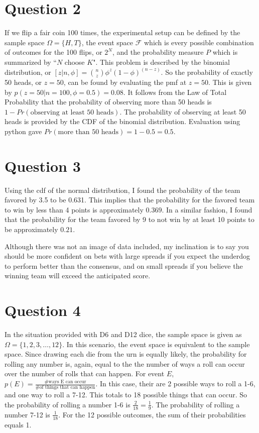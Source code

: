 \documentclass{article}[12 pt]
\begin{document}
\section*{Question 2}
If we flip a fair coin 100 times, the experimental setup can be defined by the sample space $\Omega = \{H,T\}$, the event space $\mathcal{F}$ which is every possible combination of outcomes for the 100 flips, or $2^N$, and the probability measure $P$ which is summarized by ``$N$ choose $K$".  This problem is described by the binomial distribution, or $[z|n,\phi] = {n \choose z}\phi^{z}(1-\phi)^{(n-z)} $.  So the probability of exactly 50 heads, or $z=50$, can be found by evaluating the pmf at $z=50$.  This is given by $\boxed{p(z=50|n=100,\phi=0.5) =  0.08}$.  It follows from the Law of Total Probability that the probability of observing more than 50 heads is $1-Pr(\text{observing at least 50 heads})$.  The probability of observing at least 50 heads is provided by the CDF of the binomial distribution.  Evaluation using python gave $\boxed{ Pr(\text{more than 50 heads}) = 1 -0.5 = 0.5}$.


\section*{Question 3}

Using the cdf of the normal distribution, I found the probability of the team favored by 3.5 to be 0.631.  This implies that the probability for the favored team to win by less than 4 points is approximately $\boxed{0.369}$.  In a similar fashion, I found that the probability for the team favored by 9 to not win by at least 10 points to be approximately $\boxed{0.21}$.\newline

\noindent
Although there was  not an image  of data included, my inclination is to say you should be more confident on bets with large spreads if you expect the underdog to perform better than the consensus, and on small spreads if you believe the winning team will exceed the anticipated score. 


\section*{Question 4}
In the situation provided with D6 and D12 dice, the sample space is given as $\Omega=\{1,2,3,\dots,12\}$.  In this scenario, the event space is equivalent to the sample space.  Since drawing each die from the urn is equally likely, the probability for rolling any number is, again, equal to the the number of ways a roll can occur over the number of rolls that can happen.  For event $E$, $p(E) = \frac{\text{\# ways E can occur}}{\text{\# of things that can happen}}$.  In this case, their are 2 possible ways to roll a 1-6, and one way to roll a 7-12.  This totals to 18 possible things that can occur.  So the probability of rolling a number 1-6 is $\frac{2}{18}= \boxed{\frac{1}{9}}$.  The probability of rolling a number 7-12 is $\boxed{\frac{1}{18}}$.  For the 12 possible outcomes, the sum of their probabilities equals 1. \newline
\end{document}
